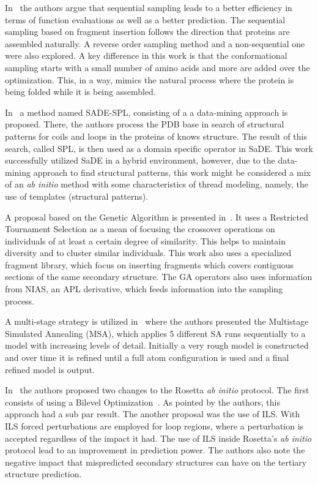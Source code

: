 In~\cite{de2017sequential} the authors argue that sequential sampling leads to a better
efficiency in terms of function evaluations as well as a better prediction. The sequential
sampling based on fragment insertion follows the direction that proteins are assembled
naturally. A reverse order sampling method and a non-sequential one were also explored.
A key difference in this work is that the conformational sampling starts with a small
number of amino acids and more are added over the optimization. This, in a way, mimics
the natural process where the protein is being folded while it is being assembled.


In~\cite{oliveira2017sade} a method named SADE-SPL, consisting of a a data-mining
approach is proposed. There, the authors process the PDB base in search of structural patterns
for coils and loops in the proteins of knows structure. The result of this search, called
SPL, is then used as a domain specific operator in \ac{SaDE}. This work successfully utilized
\ac{SaDE} in a hybrid environment, however, due to the data-mining approach to find structural
patterns, this work might be considered a mix of an \textit{ab initio} method with some
characteristics of thread modeling, namely, the use of templates (structural patterns).

A proposal based on the Genetic Algorithm is presented in~\cite{borguesan2018genetic}. It uses
a Restricted Tournament Selection as a mean of focusing the crossover operations on individuals
of at least a certain degree of similarity. This helps to maintain diversity and to cluster
similar individuals. This work also uses a specialized fragment library,
which focus on inserting fragments which covers contiguous sections of the same secondary structure.
The \ac{GA} operators also uses information from NIAS, an \ac{APL} derivative,
which feeds information into the sampling process.

A multi-stage strategy is utilized in~\cite{silva2018multistage} where the authors
presented the Multistage Simulated Annealing (MSA), which applies 5 different
SA runs sequentially to a model with increasing levels of detail. Initially a
very rough model is constructed and over time it is refined until a full atom
configuration is used and a final refined model is output.

In~\cite{kandathil2018improved} the authors proposed two changes to the Rosetta
\textit{ab initio} protocol. The first consists of using a Bilevel
Optimization~\cite{sinha2018review}. As pointed by the authors, this approach had
a sub par result. The another proposal was the use of \ac{ILS}. With ILS forced
perturbations are employed for loop regions, where a perturbation is accepted
regardless of the impact it had. The use of \ac{ILS} inside Rosetta's
\textit{ab initio} protocol lead to an improvement in prediction power.
The authors also note the negative impact that mispredicted secondary structures
can have on the tertiary structure prediction.

